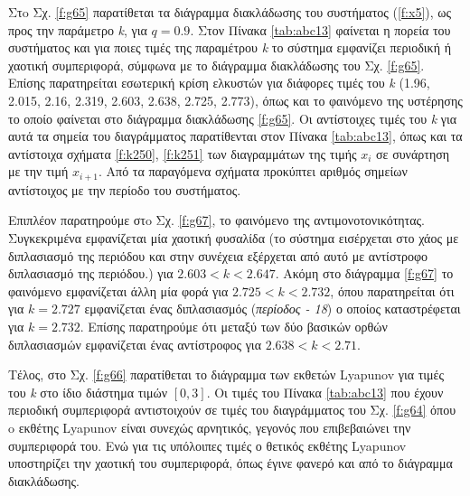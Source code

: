 Στo Σχ. \ref{f:g65} παρατίθεται τα διάγραμμα διακλάδωσης του συστήματος (\ref{f:x5}), ως προς την παράμετρο \emph{k}, για $q =0.9$. Στον Πίνακα \ref{tab:abc13} φαίνεται η πορεία του συστήματος και για ποιες τιμές της παραμέτρου \emph{k} το σύστημα εμφανίζει περιοδική ή χαοτική συμπεριφορά, σύμφωνα με το διάγραμμα διακλάδωσης του Σχ. \ref{f:g65}. Επίσης παρατηρείται εσωτερική κρίση ελκυστών για διάφορες τιμές του \emph{k} (1.96, 2.015, 2.16, 2.319, 2.603, 2.638, 2.725, 2.773), όπως και το φαινόμενο της υστέρησης το οποίο φαίνεται στο διάγραμμα διακλάδωσης \ref{f:g65}. Οι αντίστοιχες τιμές του \emph{k} για αυτά τα σημεία του διαγράμματος παρατίθενται στον Πίνακα \ref{tab:abc13}, όπως και τα αντίστοιχα σχήματα \ref{f:k250}, \ref{f:k251} των διαγραμμάτων της τιμής \(x_i\) σε συνάρτηση με την τιμή \(x_{i+1}\). Από τα παραγόμενα σχήματα προκύπτει αριθμός σημείων αντίστοιχος με την περίοδο του συστήματος.

Επιπλέον παρατηρούμε στo Σχ. \ref{f:g67}, το φαινόμενο της αντιμονοτονικότητας. Συγκεκριμένα εμφανίζεται μία χαοτική φυσαλίδα (το σύστημα εισέρχεται στο χάος με διπλασιασμό της περιόδου και στην συνέχεια εξέρχεται από αυτό με αντίστροφο διπλασιασμό της περιόδου.) για $2.603<k<2.647$. Ακόμη στο διάγραμμα \ref{f:g67} το φαινόμενο εμφανίζεται άλλη μία φορά για $2.725<k<2.732$, όπου παρατηρείται ότι για $k=2.727$ εμφανίζεται ένας διπλασιασμός (\emph{περίοδος - 18}) ο οποίος καταστρέφεται για $k=2.732$.
Επίσης παρατηρούμε ότι μεταξύ των δύο βασικών ορθών διπλασιασμών εμφανίζεται ένας αντίστροφος για $2.638<k<2.71$.

Τέλος, στο Σχ. \ref{f:g66} παρατίθεται το διάγραμμα των εκθετών Lyapunov για τιμές του \emph{k} στο ίδιο διάστημα τιμών $[0, 3]$. Οι τιμές του Πίνακα \ref{tab:abc13} που έχουν περιοδική συμπεριφορά αντιστοιχούν σε τιμές του διαγράμματος του Σχ. \ref{f:g64} όπου o εκθέτης Lyapunov είναι συνεχώς αρνητικός, γεγονός που επιβεβαιώνει την συμπεριφορά του. Ενώ για τις υπόλοιπες τιμές ο θετικός εκθέτης Lyapunov υποστηρίζει την χαοτική του συμπεριφορά, όπως έγινε φανερό και από το διάγραμμα διακλάδωσης.\\\\

